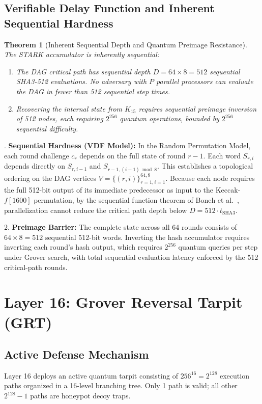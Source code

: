 \documentclass{ieeeaccess}
\newtheorem{theorem}{Theorem}
\newenvironment{proof}{\begin{IEEEproof}\IEEEQEDoff}{\end{IEEEproof}}
\begin{document}
\subsection{Verifiable Delay Function and Inherent Sequential Hardness}
\begin{theorem}[Inherent Sequential Depth and Quantum Preimage Resistance]
\label{thm:L15-vdf}
The STARK accumulator is inherently sequential:
\begin{enumerate}
  \item The DAG critical path has sequential depth $D = 64 \times 8 = 512$ sequential SHA3-512 evaluations. No adversary with $P$ parallel processors can evaluate the DAG in fewer than 512 sequential step times.
  \item Recovering the internal state from $K_{15}$ requires sequential preimage inversion of 512 nodes, each requiring $2^{256}$ quantum operations, bounded by $2^{256}$ sequential difficulty.
\end{enumerate}
\end{theorem}
\begin{proof}
1. \textbf{Sequential Hardness (VDF Model):}
In the Random Permutation Model, each round challenge $c_r$ depends on the full state of round $r-1$. Each word $S_{r,i}$ depends directly on $S_{r, i-1}$ and $S_{r-1, (i-1)\bmod 8}$.
This establishes a topological ordering on the DAG vertices $V = \{ (r, i) \}_{r=1, i=1}^{64, 8}$.
Because each node requires the full 512-bit output of its immediate predecessor as input to the Keccak-$f[1600]$ permutation, by the sequential function theorem of Boneh et al.~\cite{Boneh2018}, parallelization cannot reduce the critical path depth below $D = 512 \cdot t_{\mathrm{SHA3}}$.

2. \textbf{Preimage Barrier:}
The complete state across all 64 rounds consists of $64 \times 8 = 512$ sequential 512-bit words.
Inverting the hash accumulator requires inverting each round's hash output, which requires $2^{256}$ quantum queries per step under Grover search, with total sequential evaluation latency enforced by the 512 critical-path rounds.
\end{proof}

\section{Layer 16: Grover Reversal Tarpit (GRT)}
\label{sec:L16}

\subsection{Active Defense Mechanism}
Layer 16 deploys an active quantum tarpit consisting of $256^{16} = 2^{128}$ execution paths organized in a 16-level branching tree. Only 1 path is valid; all other $2^{128}-1$ paths are honeypot decoy traps.
\end{document}
